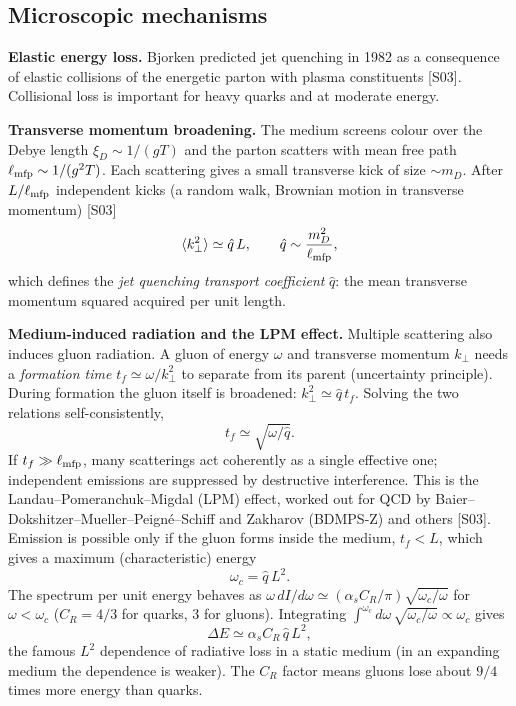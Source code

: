 \documentclass[11pt,letterpaper]{article}
\begin{document}
\subsection{Microscopic mechanisms}
\textbf{Elastic energy loss.} Bjorken predicted jet quenching in 1982 as a consequence of elastic collisions of the
energetic parton with plasma constituents [S03]. Collisional loss is important for heavy quarks and at moderate energy.

\textbf{Transverse momentum broadening.} The medium screens colour over the Debye length $\xi_D\sim1/(gT)$ and the
parton scatters with mean free path $\ell_{\rm mfp}\sim1/(g^2T)$. Each scattering gives a small transverse kick of size
$\sim m_D$. After $L/\ell_{\rm mfp}$ independent kicks (a random walk, Brownian motion in transverse momentum) [S03]
\begin{equation}
\langle k_\perp^2\rangle\simeq\hat q\,L,\qquad \hat q\sim\frac{m_D^2}{\ell_{\rm mfp}} ,
\end{equation}
which defines the \emph{jet quenching transport coefficient} $\hat q$: the mean transverse momentum squared acquired per unit length.

\textbf{Medium-induced radiation and the LPM effect.} Multiple scattering also induces gluon radiation. A gluon of
energy $\omega$ and transverse momentum $k_\perp$ needs a \emph{formation time} $t_f\simeq\omega/k_\perp^2$ to separate
from its parent (uncertainty principle). During formation the gluon itself is broadened: $k_\perp^2\simeq\hat q\,t_f$.
Solving the two relations self-consistently,
\begin{equation}
t_f\simeq\sqrt{\omega/\hat q}.
\end{equation}
If $t_f\gg\ell_{\rm mfp}$, many scatterings act coherently as a single effective one; independent emissions are
suppressed by destructive interference. This is the Landau--Pomeranchuk--Migdal (LPM) effect, worked out for QCD by
Baier--Dokshitzer--Mueller--Peign\'e--Schiff and Zakharov (BDMPS-Z) and others [S03]. Emission is possible only if the
gluon forms inside the medium, $t_f<L$, which gives a maximum (characteristic) energy
\begin{equation}
\omega_c=\hat q\,L^2 .
\end{equation}
The spectrum per unit energy behaves as $\omega\,dI/d\omega\simeq(\alpha_sC_R/\pi)\sqrt{\omega_c/\omega}$ for
$\omega<\omega_c$ ($C_R=4/3$ for quarks, 3 for gluons). Integrating $\int^{\omega_c}d\omega\,\sqrt{\omega_c/\omega}\propto\omega_c$ gives
\begin{equation}
\Delta E\simeq\alpha_s C_R\,\hat q\,L^2 ,
\end{equation}
the famous $L^2$ dependence of radiative loss in a static medium (in an expanding medium the dependence is weaker).
The $C_R$ factor means gluons lose about $9/4$ times more energy than quarks.
\end{document}
